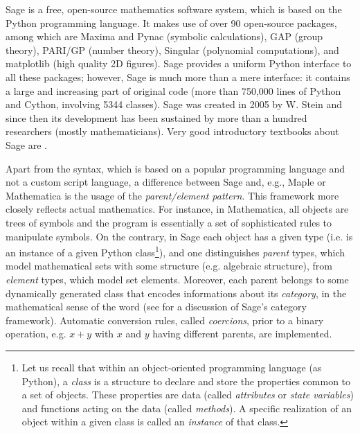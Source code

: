 \documentclass[a4paper]{jpconf}
\newcommand{\soft}[1]{\textsf{#1}}
\newcommand{\Sage}{\soft{Sage}}
\begin{document}
\Sage{} \cite{sage} is a free, open-source mathematics software system, which is
based on the Python programming language. It makes use of over 90 open-source packages, 
among which are \soft{Maxima} and \soft{Pynac} (symbolic calculations),
\soft{GAP} (group theory), 
\soft{PARI/GP} (number theory), \soft{Singular} (polynomial computations), 
and \soft{matplotlib} (high quality 2D figures). 
\Sage{} provides a uniform Python interface to all these packages; however, 
\Sage{} is much more than a mere interface: it contains a large and increasing part of 
original code (more than 750,000 lines of Python and Cython, involving 5344 classes). 
\Sage{} was created in 2005 by W. Stein \cite{SteinJ05} and since
then its development has been sustained by more than a hundred researchers
(mostly mathematicians). Very good introductory textbooks about \Sage{} are
\cite{JoyneS14,Zimme13,Bard15}. 
 
Apart from the syntax, which is based on a popular programming language and not
a custom script 
language, a difference between \Sage{} and, e.g., \soft{Maple} or \soft{Mathematica}
is the usage of the \emph{parent/element pattern}. This framework more closely
reflects actual mathematics. 
For instance, in \soft{Mathematica}, all objects 
are trees of symbols and the program is essentially a set of 
sophisticated rules to manipulate symbols. On the contrary, in \Sage{}
each object has a given type (i.e. is an instance of a given
Python class\footnote{Let us
recall that within an object-oriented programming language (as Python),
a \emph{class} is a structure to declare and store the
properties common to a set of objects. These properties 
are data (called 
\emph{attributes} or \emph{state variables}) and functions acting 
on the data (called \emph{methods}). A specific realization of an object 
within a given class is called an \emph{instance} of that class.}), 
and one distinguishes \emph{parent} types, which model mathematical
sets with some structure (e.g. algebraic structure), from \emph{element} types,
which model set elements. Moreover, each parent belongs to some 
dynamically generated class that encodes informations 
about its \emph{category}, in the mathematical sense of the word
(see \cite{sage_categories} for a discussion of \Sage{}'s category framework).
Automatic conversion rules, called \emph{coercions},
prior to a binary operation, e.g. $x+y$ with $x$ and $y$ having different 
parents, are implemented.

\end{document}
